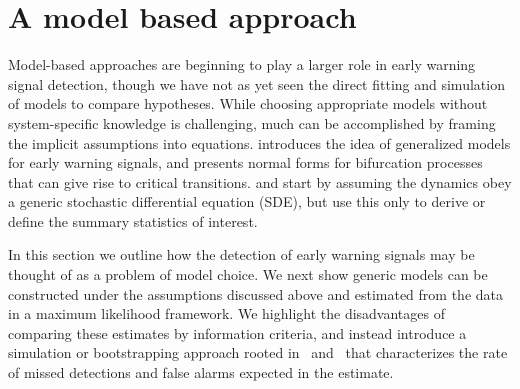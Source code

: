 \documentclass[authoryear,review,11pt]{elsarticle}
\begin{document}
\section{A model based approach}
Model-based approaches are beginning to play a larger role in early warning signal detection,
though we have not as yet seen the direct fitting and simulation of models to compare hypotheses.
While choosing appropriate models without system-specific knowledge is challenging,
much can be accomplished by framing the implicit assumptions into equations.
\citet{Lade2012} introduces the idea of generalized models for early warning signals, and
\citet{Kuehn2011} presents normal forms for bifurcation processes that can give rise to critical transitions.
\citet{Carpenter2011e} and \citet{Dakos2011a} start by assuming the dynamics obey a generic
stochastic differential equation (SDE), but use this only to derive or define the summary statistics of interest.

In this section we outline how the detection of early warning signals may be thought of
as a problem of model choice.
We next show generic models can be constructed under the assumptions discussed above
and estimated from the data in a maximum likelihood framework.
We highlight the disadvantages of comparing these estimates by information criteria,
and instead introduce a simulation or bootstrapping approach rooted in~\citet{Cox1961} and~\citet{McLachlan1987} that
characterizes the rate of missed detections and false alarms expected in the estimate.
\end{document}
